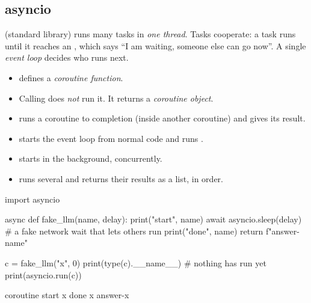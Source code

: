 \subsection{asyncio}

 (standard library) runs many tasks in \emph{one thread}. Tasks cooperate: a task
runs until it reaches an , which says ``I am waiting, someone else can go now''. A
single \emph{event loop} decides who runs next.

\begin{itemize}[nosep]
  \item {} defines a \emph{coroutine function}.
  \item Calling  does \emph{not} run it. It returns a \emph{coroutine object}.
  \item {} runs a coroutine to completion (inside another coroutine) and gives its result.
  \item {} starts the event loop from normal code and runs .
  \item {} starts  in the background, concurrently.
  \item {} runs several and returns their results as a list, in order.
\end{itemize}

\begin{center}
\end{center}

\begin{pycode}
import asyncio

async def fake_llm(name, delay):
    print("start", name)
    await asyncio.sleep(delay)        # a fake network wait that lets others run
    print("done", name)
    return f"answer-{name}"

c = fake_llm("x", 0)
print(type(c).__name__)               # nothing has run yet
print(asyncio.run(c))
\end{pycode}
\begin{rawcode}
coroutine
start x
done x
answer-x
\end{rawcode}

